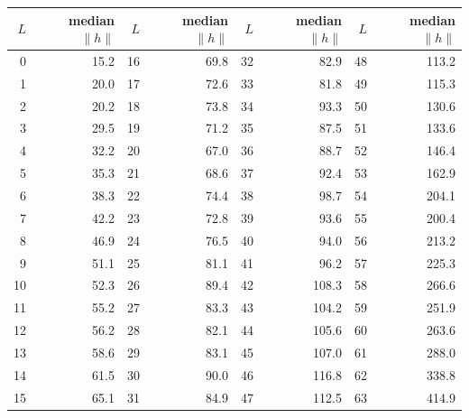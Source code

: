 \begin{tabular}{rrrrrrrr}\toprule
$L$ & median $\|h\|$ & $L$ & median $\|h\|$ & $L$ & median $\|h\|$ & $L$ & median $\|h\|$\\\midrule
0 & 15.2 & 16 & 69.8 & 32 & 82.9 & 48 & 113.2\\
1 & 20.0 & 17 & 72.6 & 33 & 81.8 & 49 & 115.3\\
2 & 20.2 & 18 & 73.8 & 34 & 93.3 & 50 & 130.6\\
3 & 29.5 & 19 & 71.2 & 35 & 87.5 & 51 & 133.6\\
4 & 32.2 & 20 & 67.0 & 36 & 88.7 & 52 & 146.4\\
5 & 35.3 & 21 & 68.6 & 37 & 92.4 & 53 & 162.9\\
6 & 38.3 & 22 & 74.4 & 38 & 98.7 & 54 & 204.1\\
7 & 42.2 & 23 & 72.8 & 39 & 93.6 & 55 & 200.4\\
8 & 46.9 & 24 & 76.5 & 40 & 94.0 & 56 & 213.2\\
9 & 51.1 & 25 & 81.1 & 41 & 96.2 & 57 & 225.3\\
10 & 52.3 & 26 & 89.4 & 42 & 108.3 & 58 & 266.6\\
11 & 55.2 & 27 & 83.3 & 43 & 104.2 & 59 & 251.9\\
12 & 56.2 & 28 & 82.1 & 44 & 105.6 & 60 & 263.6\\
13 & 58.6 & 29 & 83.1 & 45 & 107.0 & 61 & 288.0\\
14 & 61.5 & 30 & 90.0 & 46 & 116.8 & 62 & 338.8\\
15 & 65.1 & 31 & 84.9 & 47 & 112.5 & 63 & 414.9\\
\bottomrule\end{tabular}
